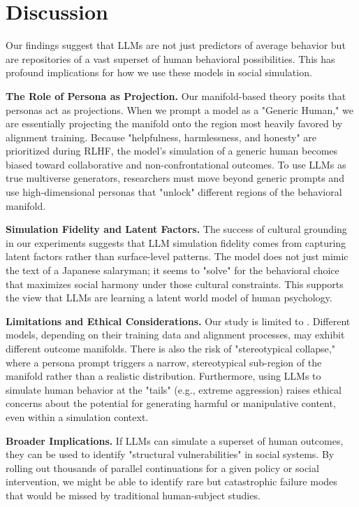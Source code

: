 \section{Discussion}
\label{sec:discussion}

Our findings suggest that LLMs are not just predictors of average behavior but are repositories of a vast superset of human behavioral possibilities. This has profound implications for how we use these models in social simulation.

{\bf The Role of Persona as Projection.} Our manifold-based theory posits that personas act as projections. When we prompt a model as a "Generic Human," we are essentially projecting the manifold onto the region most heavily favored by alignment training. Because "helpfulness, harmlessness, and honesty" are prioritized during RLHF, the model's simulation of a generic human becomes biased toward collaborative and non-confrontational outcomes. To use LLMs as true multiverse generators, researchers must move beyond generic prompts and use high-dimensional personas that "unlock" different regions of the behavioral manifold.

{\bf Simulation Fidelity and Latent Factors.} The success of cultural grounding in our experiments suggests that LLM simulation fidelity comes from capturing latent factors rather than surface-level patterns. The model does not just mimic the text of a Japanese salaryman; it seems to "solve" for the behavioral choice that maximizes social harmony under those cultural constraints. This supports the view that LLMs are learning a latent world model of human psychology.

{\bf Limitations and Ethical Considerations.} Our study is limited to \gpt. Different models, depending on their training data and alignment processes, may exhibit different outcome manifolds. There is also the risk of "stereotypical collapse," where a persona prompt triggers a narrow, stereotypical sub-region of the manifold rather than a realistic distribution. Furthermore, using LLMs to simulate human behavior at the "tails" (e.g., extreme aggression) raises ethical concerns about the potential for generating harmful or manipulative content, even within a simulation context.

{\bf Broader Implications.} If LLMs can simulate a superset of human outcomes, they can be used to identify "structural vulnerabilities" in social systems. By rolling out thousands of parallel continuations for a given policy or social intervention, we might be able to identify rare but catastrophic failure modes that would be missed by traditional human-subject studies.
